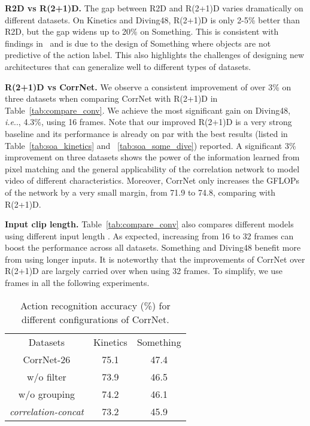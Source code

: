 \documentclass[10pt,twocolumn,letterpaper]{article}
\makeatletter
\DeclareRobustCommand\onedot{\futurelet\@let@token\@onedot}
\def\@onedot{\ifx\@let@token.\else.\null\fi\xspace}
\def\ie{\emph{i.e}\onedot} \def\Ie{\emph{I.e}\onedot}
\makeatother
\begin{document}
\noindent\textbf{R2D vs R(2+1)D.} The gap between R2D and R(2+1)D varies dramatically on different datasets. On Kinetics and Diving48, R(2+1)D is only 2-5\% better than R2D, but the gap widens up to 20\% on Something. This is consistent with findings in~\cite{xie2017rethinking} and is due to the design of Something where objects are not predictive of the action label. This also highlights the challenges of designing new architectures that can generalize well to different types of datasets.

\noindent\textbf{R(2+1)D vs CorrNet.} We observe a consistent improvement of over 3\% on three datasets when comparing CorrNet with R(2+1)D  in Table~\ref{tab:compare_conv}. We achieve the most significant gain on Diving48, \ie, 4.3\%, using 16 frames.  Note that our improved R(2+1)D is a very strong baseline and its performance is already on par with the best results (listed in Table~\ref{tab:soa_kinetics} and ~\ref{tab:soa_some_dive}) reported. A significant 3\% improvement on three datasets shows the power of the information learned from pixel matching and the general applicability of the correlation network to model video of different characteristics. Moreover, CorrNet only increases the GFLOPs of the network by a very small margin, from 71.9 to 74.8, comparing with R(2+1)D.

\noindent\textbf{Input clip length.} Table~\ref{tab:compare_conv} also compares different models using different input length . As expected, increasing  from 16 to 32 frames can boost the performance across all datasets. Something and Diving48 benefit more from using longer inputs. 
It is noteworthy that the improvements of CorrNet over R(2+1)D are largely carried over when using 32 frames. To simplify, we use  frames in all the following experiments.

\begin{table}[t]
\centering
    \begin{tabular}{c|c|c}
        \hline
        Datasets &   Kinetics  &  Something \\
        \shline
        CorrNet-26 & 75.1 & 47.4 \\\hline \hline
        w/o filter & 73.9 & 46.5 \\
        w/o grouping & 74.2 & 46.1 \\
        \textit{correlation-concat}  & 73.2 & 45.9 \\\hline
    \end{tabular} 
\caption{Action recognition accuracy (\%) for different configurations of CorrNet.}
\label{tab:comp_param}
\end{table}
\end{document}

